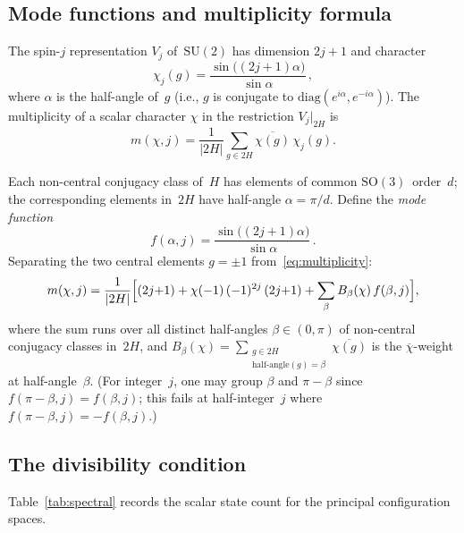 \documentclass[12pt]{article}
\theoremstyle{definition}
\theoremstyle{remark}
\newcommand{\SU}{\mathrm{SU}}
\newcommand{\SO}{\mathrm{SO}}
\begin{document}
\subsection{Mode functions and multiplicity formula}
\label{sec:modes}

The spin-$j$ representation $V_j$ of~$\SU(2)$ has
dimension $2j{+}1$ and character
\begin{equation}
  \label{eq:su2-character}
  \chi_j(g)
  = \frac{\sin\bigl((2j{+}1)\alpha\bigr)}{\sin\alpha}\,,
\end{equation}
where $\alpha$ is the half-angle of~$g$
(i.e., $g$ is conjugate to
$\mathrm{diag}(e^{i\alpha}, e^{-i\alpha})$).
The multiplicity of a scalar character $\chi$ in the
restriction $V_j|_{2H}$ is~\cite{BrockerTomDieck1985}
\begin{equation}
  \label{eq:multiplicity}
  m(\chi, j)
  = \frac{1}{|2H|}\sum_{g \in 2H}
    \overline{\chi(g)}\,\chi_j(g).
\end{equation}

Each non-central conjugacy class of~$H$ has elements of
common $\SO(3)$~order~$d$; the corresponding elements
in~$2H$ have half-angle $\alpha = \pi/d$.
Define the \emph{mode function}
\begin{equation}
  \label{eq:mode}
  f(\alpha, j)
  = \frac{\sin\bigl((2j{+}1)\alpha\bigr)}{\sin\alpha}\,.
\end{equation}
Separating the two central elements $g = \pm 1$
from~\eqref{eq:multiplicity}:
\begin{equation}
  \label{eq:mode-decomposition}
  m(\chi, j)
  = \frac{1}{|2H|}
    \Bigl[
      (2j{+}1) + \chi(-1)\,(-1)^{2j}\,(2j{+}1)
      + \sum_{\beta} B_\beta(\chi)\, f(\beta, j)
    \Bigr],
\end{equation}
where the sum runs over all distinct half-angles
$\beta \in (0,\pi)$ of non-central conjugacy classes
in~$2H$, and
$B_\beta(\chi)
= \sum_{\substack{g \in 2H\\
\text{half-angle}(g)=\beta}}
\overline{\chi(g)}$
is the $\overline{\chi}$-weight at half-angle~$\beta$.
(For integer~$j$, one may group $\beta$ and
$\pi{-}\beta$ since
$f(\pi{-}\beta,j) = f(\beta,j)$; this fails at
half-integer~$j$ where
$f(\pi{-}\beta,j) = -f(\beta,j)$.)

\subsection{The divisibility condition}
\label{sec:divisibility}

Table~\ref{tab:spectral} records the scalar state count
for the principal configuration spaces.
\end{document}
